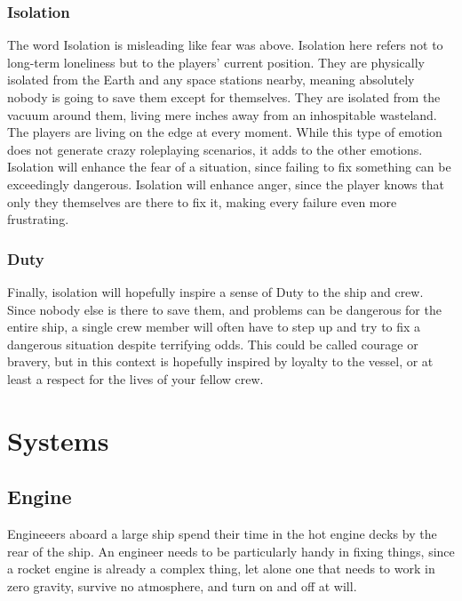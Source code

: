 \documentclass[a4paper]{article}
\begin{document}
\subsubsection{Isolation} \label{isolation}

The word Isolation is misleading like fear was above. Isolation here refers not to long-term loneliness but to the players' current position. They are physically isolated from the Earth and any space stations nearby, meaning absolutely nobody is going to save them except for themselves. They are isolated from the vacuum around them, living mere inches away from an inhospitable wasteland. The players are living on the edge at every moment. While this type of emotion does not generate crazy roleplaying scenarios, it adds to the other emotions. Isolation will enhance the fear of a situation, since failing to fix something can be exceedingly dangerous. Isolation will enhance anger, since the player knows that only they themselves are there to fix it, making every failure even more frustrating. 

\subsubsection{Duty} \label{duty}

Finally, isolation will hopefully inspire a sense of Duty to the ship and crew. Since nobody else is there to save them, and problems can be dangerous for the entire ship, a single crew member will often have to step up and try to fix a dangerous situation despite terrifying odds. This could be called courage or bravery, but in this context is hopefully inspired by loyalty to the vessel, or at least a respect for the lives of your fellow crew.


\newpage
\section{Systems} \label{systems}

\subsection{Engine} \label{engine}

Engineeers aboard a large ship spend their time in the hot engine decks by the rear of the ship. An engineer needs to be particularly handy in fixing things, since a rocket engine is already a complex thing, let alone one that needs to work in zero gravity, survive no atmosphere, and turn on and off at will.
\end{document}
